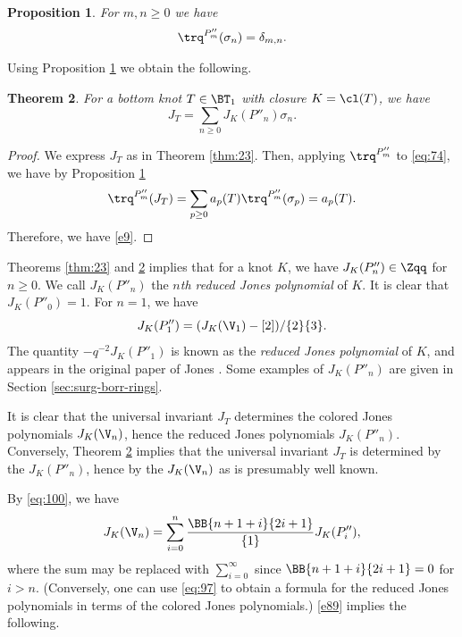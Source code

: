 \documentclass{amsart}
\numberwithin{equation}{section}
\numberwithin{figure}{section}
\theoremstyle{plain}
\newtheorem{theorem}{Theorem}[section]
\newtheorem{proposition}[theorem]{Proposition}
\theoremstyle{definition}
\theoremstyle{remark}
\begin{document}
\begin{proposition}
  \label{r22}
  For $m,n\ge 0$ we have
  \begin{gather}
    \trq^{P''_m}(\sigma _n) = \delta _{m,n}.
  \end{gather}
\end{proposition}

Using Proposition \ref{r22} we obtain the following.

\begin{theorem}
  \label{r18}
  For a bottom knot $T\in \BT_1$ with closure $K=\cl(T)$, we have
  \begin{equation}
    \label{e9}
    J_T = \sum_{n\ge 0}J_K(P''_n)\sigma _n.
  \end{equation}
\end{theorem}

\begin{proof}
  We express $J_T$ as in Theorem \ref{thm:23}.  Then, applying
  $\trq^{P''_m}$ to \eqref{eq:74}, we have by Proposition \ref{r22}
  \begin{equation*}
    \trq^{P''_m}(J_T)= \sum_{p\ge 0} a_p(T)\trq^{P''_m}(\sigma _p)
    =a_p(T).
  \end{equation*}
  Therefore, we have \eqref{e9}.
\end{proof}

Theorems \ref{thm:23} and \ref{r18} implies that for a knot $K$, we
have $J_K(P''_n)\in \Zqq$ for $n\ge 0$.  We call $J_K(P''_n)$ the {\em
$n$th reduced Jones polynomial} of $K$.  It is clear that
$J_K(P''_0)=1$.  For $n=1$, we have
\begin{equation*}
  J_K(P''_1) = (J_K(\V_1)-[2])/\{2\}\{3\}.
\end{equation*}
The quantity $-q^{-2}J_K(P''_1)$ is known as the {\em reduced Jones
polynomial} of $K$, and appears in the original paper of Jones
\cite[Proposition 12.5]{Jones2}.  Some examples of $J_K(P''_n)$ are
given in Section \ref{sec:surg-borr-rings}.

It is clear that the universal invariant $J_T$ determines the colored
Jones polynomials $J_K(\V_n)$, hence the reduced Jones polynomials
$J_K(P''_n)$.  Conversely, Theorem \ref{r18} implies that the
universal invariant $J_T$ is determined by the $J_K(P''_n)$, hence by
the $J_K(\V_n)$ as is presumably well known.

By \eqref{eq:100}, we have
\begin{equation}
  \label{e89}
  J_K(\V_n) =
  \sum_{i=0}^n\frac{\BB{n+1+i}{2i+1}}{\{1\}}J_K(P''_i),
\end{equation}
where the sum may be replaced with $\sum_{i=0}^\infty $ since
$\BB{n+1+i}{2i+1}=0$ for $i>n$.  (Conversely, one can use
\eqref{eq:97} to obtain a formula for the reduced Jones polynomials in
terms of the colored Jones polynomials.)  \eqref{e89} implies the
following.
\end{document}
